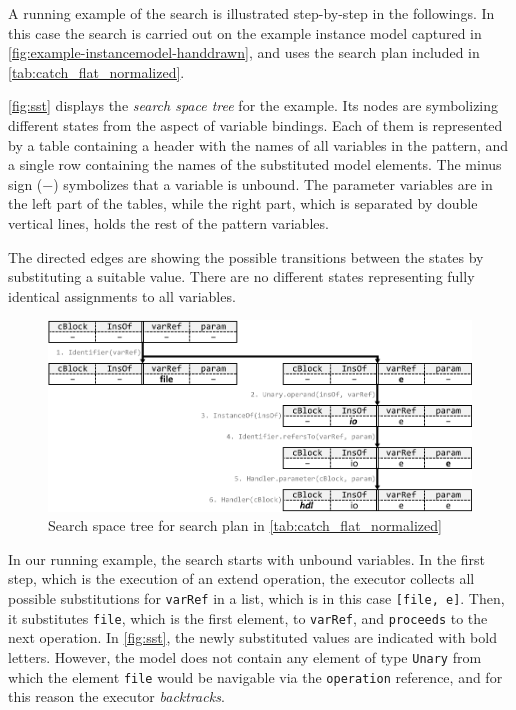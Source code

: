A running example of the search is illustrated step-by-step in the followings. In this case the search is carried out on the example instance model captured in \autoref{fig:example-instancemodel-handdrawn}, and uses the search plan included in \autoref{tab:catch_flat_normalized}.


\autoref{fig:sst} displays the \emph{search space tree} for the example. Its nodes are symbolizing different states from the aspect of variable bindings. Each of them is represented by a table containing a header with the names of all variables in the pattern, and a single row containing the names of the substituted model elements. The minus sign ($-$) symbolizes that a variable is unbound. The parameter variables are in the left part of the tables, while the right part, which is separated by double vertical lines, holds the rest of the pattern variables.

The directed edges are showing the possible transitions between the states by substituting a suitable value. There are no different states representing fully identical assignments to all variables.


\begin{figure}[!htp]
	\centering
	\includegraphics[width=\textwidth]{figures/pdfs/sst.pdf}
	\caption{Search space tree for search plan in \autoref{tab:catch_flat_normalized}}
	\label{fig:sst}
\end{figure}



In our running example, the search starts with unbound variables. In the first step, which is the execution of an extend operation, the executor collects all possible substitutions for \texttt{varRef} in a list, which is in this case \texttt{[file, e]}. Then, it substitutes \texttt{file}, which is the first element, to \texttt{varRef}, and \texttt{proceeds} to the next operation. In \autoref{fig:sst}, the newly substituted values are indicated with bold letters. However, the model does not contain any element of type \texttt{Unary} from which the element \texttt{file} would be navigable via the \texttt{operation} reference, and for this reason the executor \emph{backtracks}.

